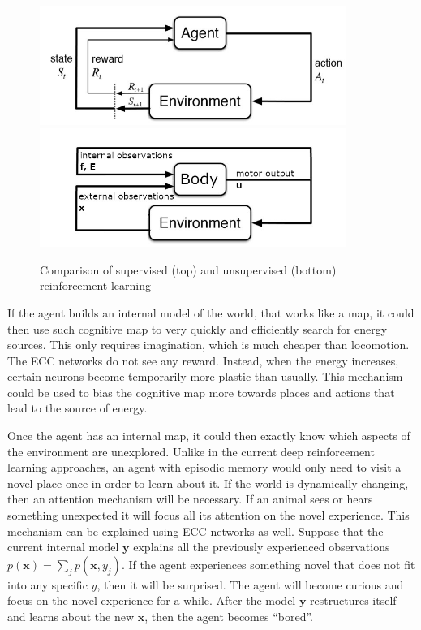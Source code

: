 \documentclass[12pt]{article}
\begin{document}
\begin{figure}[!htbp]
	\centering
	\includegraphics[width=10cm]{supervised reinforcement learning}
	\includegraphics[width=10cm]{unsupervised reinforcement learning}
	\caption{Comparison of supervised (top) and unsupervised (bottom) reinforcement learning}
	\label{fig:rl}
\end{figure} 

If the agent builds an internal model of the world, that works like a map, it could then use such cognitive map to very quickly and efficiently search for energy sources. This only requires imagination, which is much cheaper than locomotion. The ECC networks do not see any reward. Instead, when the energy increases, certain neurons become temporarily more plastic than usually. This mechanism could be used to bias the cognitive map more towards places and actions that lead to the source of energy.

Once the agent has an internal map, it could then exactly know which aspects of the environment are unexplored. Unlike in the current deep reinforcement learning approaches, an agent with episodic memory would only need to visit a novel place once in order to learn about it. If the world is dynamically changing, then an attention mechanism will be necessary. If an animal sees or hears something unexpected it will focus all its attention on the novel experience. This mechanism can be explained using ECC networks as well. Suppose that the current internal model $\boldsymbol{y}$ explains all the previously experienced observations $p(\boldsymbol{x})=\sum_j p(\boldsymbol{x},y_j)$. If the agent experiences something novel that does not fit into any specific $y$, then it will be surprised. The agent will become curious and focus on the novel experience for a while. After the model  $\boldsymbol{y}$ restructures itself and learns about the new $\boldsymbol{x}$, then the agent becomes ``bored''. 
\end{document}
